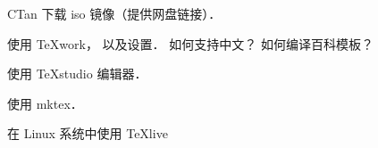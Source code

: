 
\begin{issues}
\issueTODO
\end{issues}

CTan 下载 iso 镜像（提供网盘链接）．

使用 TeXwork， 以及设置． 如何支持中文？ 如何编译百科模板？

使用 TeXstudio 编辑器．

使用 mktex．

在 Linux 系统中使用 TeXlive
